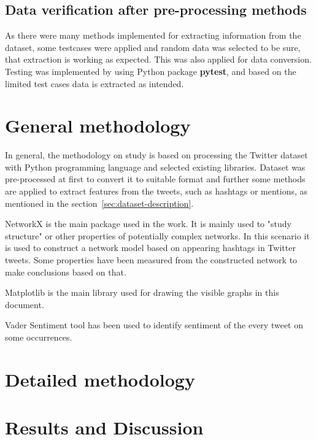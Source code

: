 \documentclass[conference]{IEEEtran}
\begin{document}
\subsection{Data verification after pre-processing methods}


As there were many methods implemented for extracting information from the dataset, some testcases were applied
and random data was selected to be sure, that extraction is working as expected.
This was also applied for data conversion.
Testing was implemented by using Python package \textbf{pytest}\cite{pytestx.y}, and based on the limited test cases data is extracted as intended.

\section{General methodology}\label{sec:general-methodology}

In general, the methodology on study is based on processing the Twitter dataset with Python programming language and selected existing libraries.
Dataset was pre-processed at first to convert it to suitable format and further some methods are applied to extract
features from the tweets, such as hashtags or mentions, as mentioned in the section~\ref{sec:dataset-description}.


NetworkX\cite{SciPyProceedings_11} is the main package used in the work.
It is mainly used to "study structure" or other properties of potentially complex networks.
In this scenario it is used to construct a network model based on appearing hashtags in Twitter tweets.
Some properties have been measured from the constructed network to make conclusions based on that.

Matplotlib\cite{4160265} is the main library used for drawing the visible graphs in this document.

Vader Sentiment\cite{Hutto_Gilbert_2014} tool has been used to identify sentiment of the every tweet on some occurrences.


\section{Detailed methodology}\label{sec:detailed-methodology}



\section{Results and Discussion}\label{sec:results-and-discussion}
\end{document}
